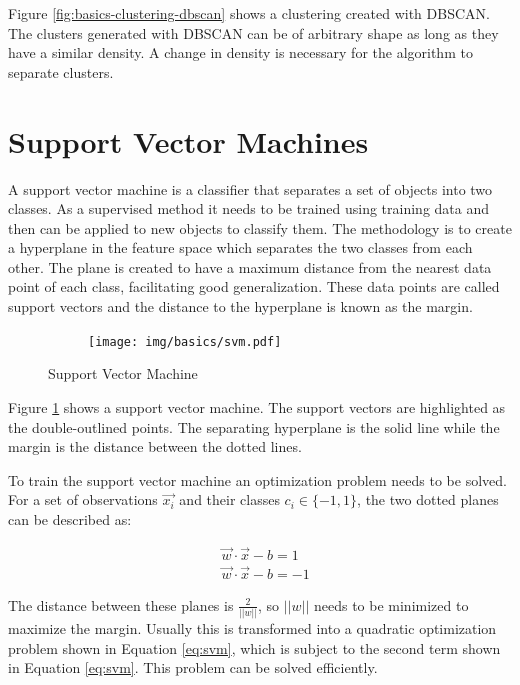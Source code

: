 \documentclass[pdftex,12pt,a4paper]{report}
\begin{document}
Figure \ref{fig:basics-clustering-dbscan} shows a clustering created with DBSCAN. The clusters generated with DBSCAN can be of arbitrary shape as long as they have a similar density. A change in density is necessary for the algorithm to separate clusters. 

\section{Support Vector Machines}

A support vector machine is a classifier that separates a set of objects into two classes. As a supervised method it needs to be trained using training data and then can be applied to new objects to classify them. The methodology is to create a hyperplane in the feature space which separates the two classes from each other. The plane is created to have a maximum distance from the nearest data point of each class, facilitating good generalization. These data points are called support vectors and the distance to the hyperplane is known as the margin.

\begin{figure}[h]
	\centering
	\begin{subfigure}[b]{0.75\textwidth}
		\centering
		\texttt{[image: img/basics/svm.pdf]}
	\end{subfigure}
	\caption{Support Vector Machine}
	\label{fig:basics-svm}
\end{figure}

Figure \ref{fig:basics-svm} shows a support vector machine. The support vectors are highlighted as the double-outlined points. The separating hyperplane is the solid line while the margin is the distance between the dotted lines.

To train the support vector machine an optimization problem needs to be solved. For a set of observations $\vec{x_i}$ and their classes $c_i \in \{ -1, 1 \}$, the two dotted planes can be described as:

\begin{equation}
\begin{split}
	& \vec{w} \cdot \vec{x} - b = 1 \\
	& \vec{w} \cdot \vec{x} - b = -1
\end{split}
\end{equation}

The distance between these planes is $\frac{2}{||w||}$, so $||w||$ needs to be minimized to maximize the margin. Usually this is transformed into a quadratic optimization problem shown in Equation \ref{eq:svm}, which is subject to the second term shown in Equation \ref{eq:svm}. This problem can be solved efficiently.
\end{document}
